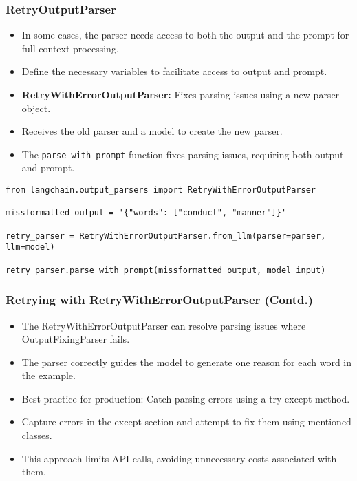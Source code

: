 \begin{frame}[fragile]
\frametitle{RetryOutputParser}
\begin{itemize}
    \item In some cases, the parser needs access to both the output and the prompt for full context processing.
    \item Define the necessary variables to facilitate access to output and prompt.
    \item \textbf{RetryWithErrorOutputParser:} Fixes parsing issues using a new parser object.
    \item Receives the old parser and a model to create the new parser.
    \item The \texttt{parse\_with\_prompt} function fixes parsing issues, requiring both output and prompt.
\end{itemize}

\begin{lstlisting}
from langchain.output_parsers import RetryWithErrorOutputParser

missformatted_output = '{"words": ["conduct", "manner"]}'

retry_parser = RetryWithErrorOutputParser.from_llm(parser=parser, llm=model)

retry_parser.parse_with_prompt(missformatted_output, model_input)
\end{lstlisting}

\end{frame}

\begin{frame}[fragile]
\frametitle{Retrying with RetryWithErrorOutputParser (Contd.)}

\begin{itemize}
    \item The RetryWithErrorOutputParser can resolve parsing issues where OutputFixingParser fails.
    \item The parser correctly guides the model to generate one reason for each word in the example.
    \item Best practice for production: Catch parsing errors using a try-except method.
    \item Capture errors in the except section and attempt to fix them using mentioned classes.
    \item This approach limits API calls, avoiding unnecessary costs associated with them.
\end{itemize}

\end{frame}


